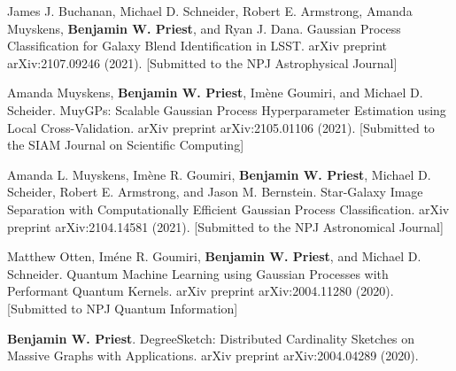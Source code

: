 \item James J. Buchanan, Michael D. Schneider, Robert E. Armstrong, Amanda Muyskens, \textbf{Benjamin W. Priest}, and Ryan J. Dana.
	Gaussian Process Classification for Galaxy Blend Identification in LSST.
	arXiv preprint
	arXiv:2107.09246
	(2021).
	[Submitted to the NPJ Astrophysical Journal]

\item Amanda Muyskens, \textbf{Benjamin W. Priest}, Im\`{e}ne Goumiri, and Michael D. Scheider.
	MuyGPs: Scalable Gaussian Process Hyperparameter Estimation using Local Cross-Validation.
	arXiv preprint
	arXiv:2105.01106
	(2021).
	[Submitted to the SIAM Journal on Scientific Computing]

\item Amanda L. Muyskens, Im\`{e}ne R. Goumiri, \textbf{Benjamin W. Priest}, Michael D. Scheider, Robert E. Armstrong, and Jason M. Bernstein.
	Star-Galaxy Image Separation with Computationally Efficient Gaussian Process Classification.
	arXiv preprint
	arXiv:2104.14581
	(2021).
	[Submitted to the NPJ Astronomical Journal]

\item Matthew Otten, Im\'{e}ne R. Goumiri, \textbf{Benjamin W. Priest}, and Michael D. Schneider.
	Quantum Machine Learning using Gaussian Processes with Performant Quantum Kernels.
	arXiv preprint
	arXiv:2004.11280
	(2020).
	[Submitted to NPJ Quantum Information]

\item \textbf{Benjamin W. Priest}.
	Degree{S}ketch: Distributed Cardinality Sketches on Massive Graphs with Applications. 
	arXiv preprint
	arXiv:2004.04289 
	(2020).
		
